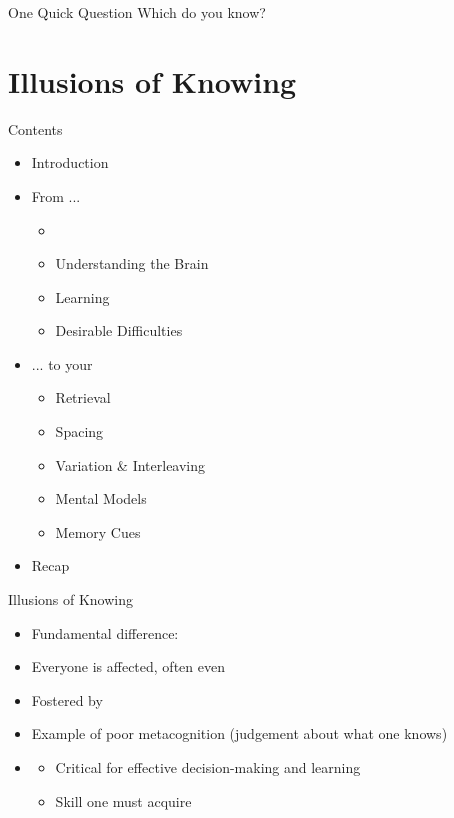 \documentclass{ercisbeamer}
\begin{document}
\begin{frame}{One Quick Question}
    \centering Which  do you know?
\end{frame}

\section{Illusions of Knowing}
\begin{frame}{Contents}
    \begin{itemize}
        \item Introduction
        \item From ...
        \begin{itemize}
            \item {}
            \item Understanding the Brain
            \item Learning
            \item Desirable Difficulties
        \end{itemize}
        \item ... to your 
        \begin{itemize}
            \item Retrieval
            \item Spacing
            \item Variation \& Interleaving
            \item Mental Models
            \item Memory Cues
        \end{itemize}
        \item Recap
    \end{itemize}
\end{frame}

\begin{frame}{Illusions of Knowing}
    \begin{tbox}
        \begin{itemize}
            \item Fundamental difference: 
            \item Everyone is affected, often  even 
            \item Fostered by 
            \item Example of poor metacognition (judgement about what one knows)
            \item {}
            \begin{itemize}
                \item Critical for effective decision-making and learning
                \item Skill one must acquire
            \end{itemize}
        \end{itemize}
    \end{tbox}
\end{frame}
\end{document}
